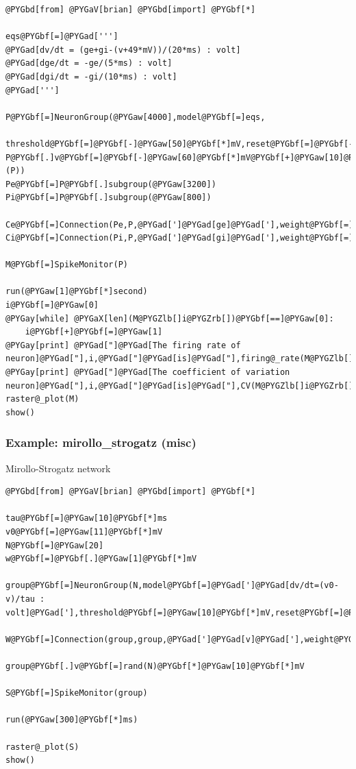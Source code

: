 \documentclass[letterpaper,10pt,english]{manual}
\begin{document}
\begin{Verbatim}[commandchars=@\[\]]
@PYGbd[from] @PYGaV[brian] @PYGbd[import] @PYGbf[*]

eqs@PYGbf[=]@PYGad[''']
@PYGad[dv/dt = (ge+gi-(v+49*mV))/(20*ms) : volt]
@PYGad[dge/dt = -ge/(5*ms) : volt]
@PYGad[dgi/dt = -gi/(10*ms) : volt]
@PYGad[''']

P@PYGbf[=]NeuronGroup(@PYGaw[4000],model@PYGbf[=]eqs,
              threshold@PYGbf[=]@PYGbf[-]@PYGaw[50]@PYGbf[*]mV,reset@PYGbf[=]@PYGbf[-]@PYGaw[60]@PYGbf[*]mV)
P@PYGbf[.]v@PYGbf[=]@PYGbf[-]@PYGaw[60]@PYGbf[*]mV@PYGbf[+]@PYGaw[10]@PYGbf[*]mV@PYGbf[*]rand(@PYGaX[len](P))
Pe@PYGbf[=]P@PYGbf[.]subgroup(@PYGaw[3200])
Pi@PYGbf[=]P@PYGbf[.]subgroup(@PYGaw[800])

Ce@PYGbf[=]Connection(Pe,P,@PYGad[']@PYGad[ge]@PYGad['],weight@PYGbf[=]@PYGaw[1.62]@PYGbf[*]mV,sparseness@PYGbf[=]@PYGaw[0.02])
Ci@PYGbf[=]Connection(Pi,P,@PYGad[']@PYGad[gi]@PYGad['],weight@PYGbf[=]@PYGbf[-]@PYGaw[9]@PYGbf[*]mV,sparseness@PYGbf[=]@PYGaw[0.02])

M@PYGbf[=]SpikeMonitor(P)

run(@PYGaw[1]@PYGbf[*]second)
i@PYGbf[=]@PYGaw[0]
@PYGay[while] @PYGaX[len](M@PYGZlb[]i@PYGZrb[])@PYGbf[==]@PYGaw[0]:
    i@PYGbf[+]@PYGbf[=]@PYGaw[1]
@PYGay[print] @PYGad["]@PYGad[The firing rate of neuron]@PYGad["],i,@PYGad["]@PYGad[is]@PYGad["],firing@_rate(M@PYGZlb[]i@PYGZrb[])@PYGbf[*]Hz
@PYGay[print] @PYGad["]@PYGad[The coefficient of variation neuron]@PYGad["],i,@PYGad["]@PYGad[is]@PYGad["],CV(M@PYGZlb[]i@PYGZrb[])
raster@_plot(M)
show()
\end{Verbatim}

\resetcurrentobjects
\hypertarget{--doc-examples-misc_mirollo_strogatz}{}

\hypertarget{index-70}{}\subsubsection{Example: mirollo\_strogatz (misc)}

Mirollo-Strogatz network

\begin{Verbatim}[commandchars=@\[\]]
@PYGbd[from] @PYGaV[brian] @PYGbd[import] @PYGbf[*]

tau@PYGbf[=]@PYGaw[10]@PYGbf[*]ms
v0@PYGbf[=]@PYGaw[11]@PYGbf[*]mV
N@PYGbf[=]@PYGaw[20]
w@PYGbf[=]@PYGbf[.]@PYGaw[1]@PYGbf[*]mV

group@PYGbf[=]NeuronGroup(N,model@PYGbf[=]@PYGad[']@PYGad[dv/dt=(v0-v)/tau : volt]@PYGad['],threshold@PYGbf[=]@PYGaw[10]@PYGbf[*]mV,reset@PYGbf[=]@PYGaw[0]@PYGbf[*]mV)

W@PYGbf[=]Connection(group,group,@PYGad[']@PYGad[v]@PYGad['],weight@PYGbf[=]w)

group@PYGbf[.]v@PYGbf[=]rand(N)@PYGbf[*]@PYGaw[10]@PYGbf[*]mV

S@PYGbf[=]SpikeMonitor(group)

run(@PYGaw[300]@PYGbf[*]ms)

raster@_plot(S)
show()
\end{Verbatim}
\end{document}
